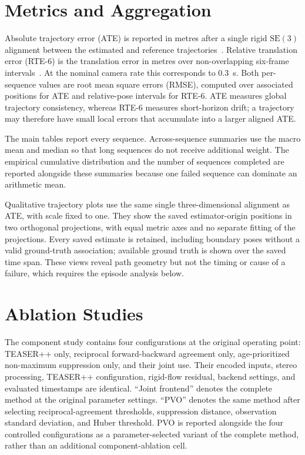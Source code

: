 \section{Metrics and Aggregation}

Absolute trajectory error (ATE) is reported in metres after a single rigid
$\mathrm{SE}(3)$ alignment between the estimated and reference trajectories~\cite{umeyama1991least,sturm2012benchmark}.
Relative translation error (RTE-6) is the translation error in metres over
non-overlapping six-frame intervals~\cite{sturm2012benchmark}. At the nominal camera rate this corresponds
to \SI{0.3}{\second}. Both per-sequence values are root mean square errors
(RMSE), computed over associated positions for ATE and relative-pose intervals
for RTE-6. ATE measures global trajectory consistency, whereas RTE-6
measures short-horizon drift; a trajectory may therefore have small local errors
that accumulate into a larger aligned ATE.

The main tables report every sequence. Across-sequence summaries use the macro
mean and median so that long sequences do not receive additional weight. The
empirical cumulative distribution and the number of sequences completed are
reported alongside these summaries because one failed sequence can dominate an
arithmetic mean.

Qualitative trajectory plots use the same single three-dimensional alignment
as ATE, with scale fixed to one. They show the saved estimator-origin positions
in two orthogonal projections, with equal metric axes and no separate fitting
of the projections. Every saved estimate is retained, including boundary poses
without a valid ground-truth association; available ground truth is shown over
the saved time span. These views reveal path geometry but not the timing or
cause of a failure, which requires the episode analysis below.

\section{Ablation Studies}

The component study contains four configurations at the original operating
point: TEASER++ only, reciprocal forward-backward agreement only,
age-prioritized non-maximum suppression only, and their joint use. Their encoded
inputs, stereo processing, TEASER++ configuration, rigid-flow residual, backend
settings, and evaluated timestamps are identical. ``Joint frontend'' denotes
the complete method at the original parameter settings. ``PVO'' denotes the same
method after selecting reciprocal-agreement thresholds, suppression distance,
observation standard deviation, and Huber threshold. PVO is reported alongside
the four controlled configurations as a parameter-selected variant of the
complete method, rather than an additional component-ablation cell.

